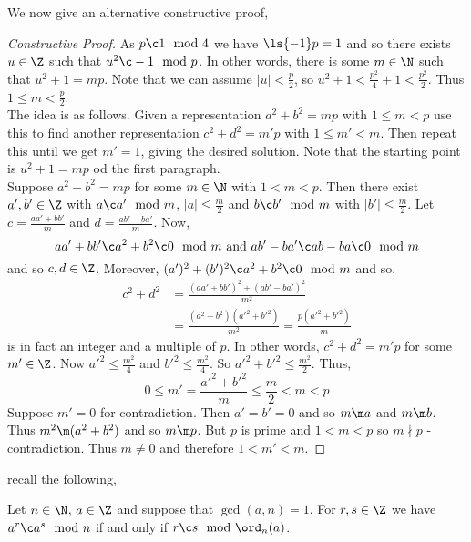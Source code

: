 \noindent
We now give an alternative constructive proof,
\begin{proof}[Constructive Proof]
  As $p \c 1 \mod 4$ we have $\ls {-1} p = 1$ and so there exists $u \in \Z$ such that $u^2 \c -1 \mod p$. In other words, there is some $m \in \N$ such that $u^2 + 1 = mp$. Note that we can assume $|u| < \frac{p}{2}$, so $u^2 + 1 < \frac{p^2}{4} + 1 < \frac{p^2}{2}$.
  Thus $1 \le m < \frac{p}{2}$.\\

  \noindent
  The idea is as follows. Given a representation $a^2 + b^2 = mp$ with $1 \le m < p$ use this to find another representation $c^2 + d^2 = m'p$ with $1 \le m' < m$. Then repeat this until we get $m' = 1$, giving the desired solution. Note that the starting point is $u^2 + 1 = mp$ od the first paragraph.\\

  \noindent
  Suppose $a^2 + b^2 = mp$ for some $m \in \N$ with $1 < m < p$. Then there exist $a', b' \in \Z$ with $a\c a'\mod m$, $|a| \le \frac{m}{2}$ and $b \c b' \mod m$ with $|b'| \le \frac{m}{2}$. Let $c = \frac{aa' + bb'}{m}$ and $d = \frac{ab' - ba'}{m}$.
  Now,
  $$ aa' + bb' \c a^2 + b^2 \c 0 \mod m \text{ and } ab' - ba' \c ab - ba \c 0 \mod m$$
  and so $c, d \in \Z$. Moreover, $(a')^2 + (b')^2 \c a^2 + b^2 \c 0 \mod m$ and so,
  \begin{align*}
    c^2 + d^2 &= \frac{(aa' + bb')^2 + (ab' - ba')^2}{m^2} \\
    &= \frac{(a^2 + b^2)(a'^2 + b'^2)}{m^2} = \frac{p(a'^2 + b'^2)}{m}
  \end{align*}
  is in fact an integer and a multiple of $p$. In other words, $c^2 + d^2 = m'p$ for some $m' \in \Z$. Now $a'^2 \le \frac{m^2}{4}$ and $b'^2 \le \frac{m^2}{4}$. So $a'^2 + b'^2 \le \frac{m^2}{2}$. Thus,
  $$ 0 \le m' = \frac{a'^2 + b'^2}{m} \le \frac{m}{2} < m < p $$
  Suppose $m' = 0$ for contradiction. Then $a' = b' = 0$ and so $m \m a$ and $m \m b$. Thus $m^2 \m (a^2 + b^2)$ and so $m \m p$. But $p$ is prime and $1 < m < p$ so $m \nmid p$ - contradiction. Thus $m \ne 0$ and therefore $1 < m' < m$.
\end{proof}

\noindent
recall the following,
\begin{nprop}
  Let $n \in \N$, $a \in \Z$ and suppose that $\gcd(a, n) = 1$. For $r, s \in \Z$ we have $a^r \c a^s \mod n$ if and only if $r \c s \mod \ord_n(a)$.
\end{nprop}

